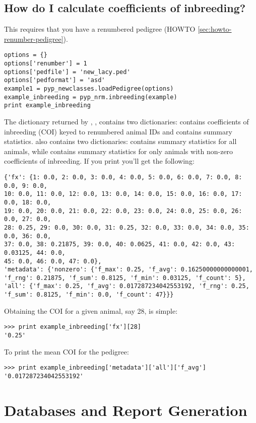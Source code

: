 \subsection{How do I calculate coefficients of inbreeding?}
\label{sec:howto-calculate-inbreeding}
This requires that you have a renumbered pedigree (HOWTO \ref{sec:howto-renumber-pedigree}).
\begin{verbatim}
options = {}
options['renumber'] = 1
options['pedfile'] = 'new_lacy.ped'
options['pedformat'] = 'asd'
example1 = pyp_newclasses.loadPedigree(options)
example_inbreeding = pyp_nrm.inbreeding(example)
print example_inbreeding
\end{verbatim}
The dictionary returned by , , contains two dictionaries:  contains coefficients of inbreeding (COI) keyed to renumbered animal IDs and  contains summary statistics.   also contains two dictionaries:  contains summary statistics for all animals, while  contains summary statistics for only animals with non-zero coefficients of inbreeding.  If you print  you'll get the following:
\begin{verbatim}
{'fx': {1: 0.0, 2: 0.0, 3: 0.0, 4: 0.0, 5: 0.0, 6: 0.0, 7: 0.0, 8: 0.0, 9: 0.0,
10: 0.0, 11: 0.0, 12: 0.0, 13: 0.0, 14: 0.0, 15: 0.0, 16: 0.0, 17: 0.0, 18: 0.0,
19: 0.0, 20: 0.0, 21: 0.0, 22: 0.0, 23: 0.0, 24: 0.0, 25: 0.0, 26: 0.0, 27: 0.0,
28: 0.25, 29: 0.0, 30: 0.0, 31: 0.25, 32: 0.0, 33: 0.0, 34: 0.0, 35: 0.0, 36: 0.0,
37: 0.0, 38: 0.21875, 39: 0.0, 40: 0.0625, 41: 0.0, 42: 0.0, 43: 0.03125, 44: 0.0,
45: 0.0, 46: 0.0, 47: 0.0},
'metadata': {'nonzero': {'f_max': 0.25, 'f_avg': 0.16250000000000001,
'f_rng': 0.21875, 'f_sum': 0.8125, 'f_min': 0.03125, 'f_count': 5},
'all': {'f_max': 0.25, 'f_avg': 0.017287234042553192, 'f_rng': 0.25,
'f_sum': 0.8125, 'f_min': 0.0, 'f_count': 47}}}
\end{verbatim}
Obtaining the COI for a given animal, say 28, is simple:
\begin{verbatim}
>>> print example_inbreeding['fx'][28]
'0.25'
\end{verbatim}
To print the mean COI for the pedigree:
\begin{verbatim}
>>> print example_inbreeding['metadata']['all']['f_avg']
'0.017287234042553192'
\end{verbatim}
\section{Databases and Report Generation}
\label{sec:howto-databases-and-reports}
